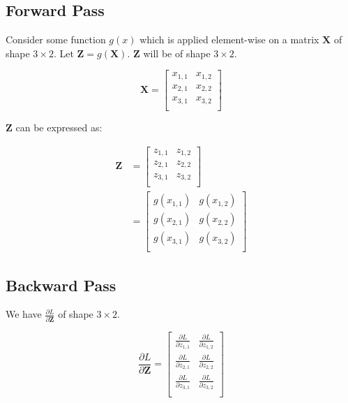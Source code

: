 \documentclass{article}
\newcommand{\matr}[1]{\mathbf{#1}} %
\begin{document}
\subsection{Forward Pass}
Consider some function $g(x)$ which is applied element-wise on a matrix $\matr{X}$ of shape $3 \times 2$. Let $\matr{Z} = g(\matr{X})$. $\matr{Z}$ will be of shape $3 \times 2$.

\begin{displaymath}
\matr{X} =
\begin{bmatrix}
x_{1,1} & x_{1,2} \\%
x_{2,1} & x_{2,2} \\%
x_{3,1} & x_{3,2} \\%
\end{bmatrix}
\end{displaymath}

$\matr{Z}$ can be expressed as:

\begin{align}
\matr{Z} &=
\begin{bmatrix}
z_{1,1} & z_{1,2} \\%
z_{2,1} & z_{2,2} \\%
z_{3,1} & z_{3,2} \\%
\end{bmatrix}
\nonumber \\
&=
\begin{bmatrix}
g(x_{1,1}) & g(x_{1,2}) \\[0.5em]
g(x_{2,1}) & g(x_{2,2}) \\[0.5em]
g(x_{3,1}) & g(x_{3,2}) \\[0.5em]
\end{bmatrix}
\end{align}

\subsection{Backward Pass}
We have $\frac{\partial L}{\partial \matr{Z}}$ of shape $3 \times 2$.

\begin{displaymath}
\frac{\partial L}{\partial \matr{Z}} =
\begin{bmatrix}
\frac{\partial L}{\partial z_{1,1}} & \frac{\partial L}{\partial z_{1,2}} \\[0.5em]
\frac{\partial L}{\partial z_{2,1}} & \frac{\partial L}{\partial z_{2,2}} \\[0.5em]
\frac{\partial L}{\partial z_{3,1}} & \frac{\partial L}{\partial z_{3,2}} \\[0.5em]
\end{bmatrix}
\end{displaymath}
\end{document}
